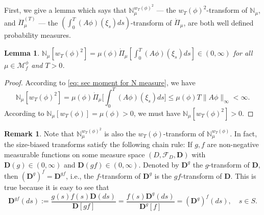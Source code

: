 \documentclass[UTF8]{pkuthss}
\theoremstyle{plain}
\newtheorem{lem}[thm]{Lemma}
\theoremstyle{definition}
\newtheorem{rem}[thm]{Remark}
\numberwithin{equation}{section}
\begin{document}
	First, we give a lemma which says that $\mathbb N_\mu^{w_T(\phi)^2}$ --- the $w_T(\phi)^2$-transform of $\mathbb N_\mu$, and $\ddot{\Pi}^{(T)}_\mu$ --- the $(\int_0^T (A\phi)(\xi_s) ds)$-transform of $\dot{\Pi}_{\mu}$, are both well defined probability measures.
\begin{lem}
	$\mathbb N_\mu[w_T(\phi)^2]
	= \mu(\phi) \dot{\Pi}_{\mu} [ \int_0^T (A\phi)(\xi_s) ds]\in (0,\infty)$ for all $\mu \in \mathcal M_f^\phi$ and $T>0$.
\end{lem}
\begin{proof}
	According to \eqref{eq: sec moment for N measure}, we have
\begin{equation}
	\mathbb N_\mu[w_T(\phi)^2 ]
	= \mu(\phi) \dot{\Pi}_\mu \Big[ \int_0^T( A \phi)(\xi_s)ds \Big] \leq \mu(\phi) T \|A\phi\|_\infty <  \infty.
\end{equation}
	According to $\mathbb N_\mu[w_T(\phi)] = \mu(\phi) > 0$, we must have $\mathbb N_\mu[w_T(\phi)^2 ] > 0$.
\end{proof}
\begin{rem}\label{rem:chain-rule}
	Note that $\mathbb N^{w_T(\phi)^2}_\mu$ is also the $w_T(\phi)$-transform of $\mathbb N^{w_T(\phi)}_\mu$.
	In fact, the size-biased transforms satisfy the following chain rule:
	If $g,f$ are non-negative measurable functions on some measure space $(D,\mathscr F_D,\mathbf D)$ with $\mathbf D(g) \in (0,\infty)$ and $\mathbf D(gf) \in (0,\infty)$.
	Denoted by $\mathbf D^g$ the $g$-transform of $\mathbf D$, then $(\mathbf D^g)^f = \mathbf D^{gf}$, i.e., the $f$-transform of $\mathbf D^g$ is the $gf$-transform of $\mathbf D$.
	This is true because it is easy to see that
\[
	\mathbf D^{gf}(ds)
	:= \frac{g(s) f(s) \mathbf D(ds)}{\mathbf D[gf]}
	= \frac{f(s) \mathbf D^g(ds)}{\mathbf D^g[f]}
    = (\mathbf D^g)^f (ds),
	\quad s\in S.
\]
\end{rem}
\end{document}
